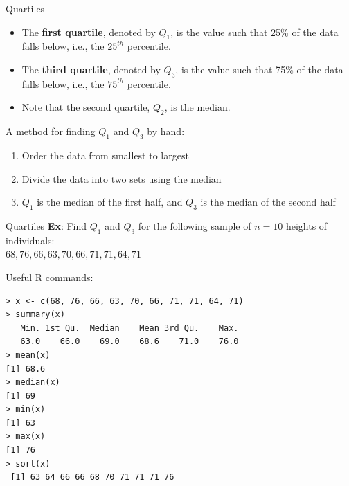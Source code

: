 \documentclass{beamer}
\begin{document}
\begin{frame}{Quartiles}

\begin{itemize}
\item The \textbf{first quartile}, denoted by $Q_1$, is the value such that 25\% of the data falls below, i.e., the $25^{th}$ percentile.
\item The \textbf{third quartile}, denoted by $Q_3$, is the value such that 75\% of the data falls below, i.e., the $75^{th}$ percentile.
\item Note that the second quartile, $Q_2$, is the median.
\end{itemize}
\vspace{10pt}

A method for finding $Q_1$ and $Q_3$ by hand:
\begin{enumerate}
\item Order the data from smallest to largest
\item Divide the data into two sets using the median
\item $Q_1$ is the median of the first half, and $Q_3$ is the median of the second half\\
\end{enumerate} 
\end{frame}

\begin{frame}{Quartiles}
\vspace{-3cm}
\textbf{Ex}: Find $Q_1$ and $Q_3$ for the following sample of $n=10$ heights of individuals:\\ $68, 76, 66, 63, 70, 66, 71, 71, 64, 71$\\
\end{frame}

\begin{frame}[fragile]
Useful R commands:
\small
\begin{verbatim}
> x <- c(68, 76, 66, 63, 70, 66, 71, 71, 64, 71)
> summary(x) 
   Min. 1st Qu.  Median    Mean 3rd Qu.    Max. 
   63.0    66.0    69.0    68.6    71.0    76.0 
> mean(x)
[1] 68.6
> median(x)
[1] 69
> min(x)
[1] 63
> max(x)
[1] 76
> sort(x)
 [1] 63 64 66 66 68 70 71 71 71 76
\end{verbatim}
\end{frame}
\end{document}
